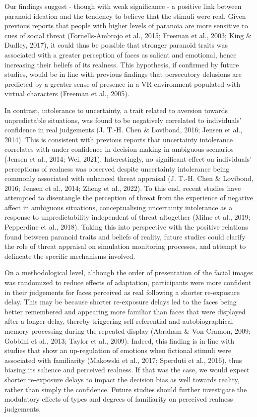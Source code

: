 \documentclass[
  man,floatsintext]{apa6}
\begin{document}
Our findings suggest - though with weak significance - a positive link between paranoid ideation and the tendency to believe that the stimuli were real. Given previous reports that people with higher levels of paranoia are more sensitive to cues of social threat (Fornells-Ambrojo et al., 2015; Freeman et al., 2003; King \& Dudley, 2017), it could thus be possible that stronger paranoid traits was associated with a greater perception of faces as salient and emotional, hence increasing their beliefs of its realness. This hypothesis, if confirmed by future studies, would be in line with previous findings that persecutory delusions are predicted by a greater sense of presence in a VR environment populated with virtual characters (Freeman et al., 2005).

In contrast, intolerance to uncertainty, a trait related to aversion towards unpredictable situations, was found to be negatively correlated to individuals' confidence in real judgements (J. T.-H. Chen \& Lovibond, 2016; Jensen et al., 2014). This is consistent with previous reports that uncertainty intolerance correlates with under-confidence in decision-making in ambiguous scenarios (Jensen et al., 2014; Wei, 2021). Interestingly, no significant effect on individuals' perceptions of realness was observed despite uncertainty intolerance being commonly associated with enhanced threat appraisal (J. T.-H. Chen \& Lovibond, 2016; Jensen et al., 2014; Zheng et al., 2022). To this end, recent studies have attempted to disentangle the perception of threat from the experience of negative affect in ambiguous situations, conceptualising uncertainty intolerance as a response to unpredictability independent of threat altogether (Milne et al., 2019; Pepperdine et al., 2018). Taking this into perspective with the positive relations found between paranoid traits and beliefs of reality, future studies could clarify the role of threat appraisal on simulation monitoring processes, and attempt to delineate the specific mechanisms involved.

On a methodological level, although the order of presentation of the facial images was randomized to reduce effects of adaptation, participants were more confident in their judgements for faces perceived as real following a shorter re-exposure delay. This may be because shorter re-exposure delays led to the faces being better remembered and appearing more familiar than faces that were displayed after a longer delay, thereby triggering self-referential and autobiographical memory processing during the repeated display (Abraham \& Von Cramon, 2009; Gobbini et al., 2013; Taylor et al., 2009). Indeed, this finding is in line with studies that show an up-regulation of emotions when fictional stimuli were associated with familiarity (Makowski et al., 2017; Sperduti et al., 2016), thus biasing its salience and perceived realness. If that was the case, we would expect shorter re-exposure delays to impact the decision bias as well towards reality, rather than simply the confidence. Future studies should further investigate the modulatory effects of types and degrees of familiarity on perceived realness judgements.
\end{document}
